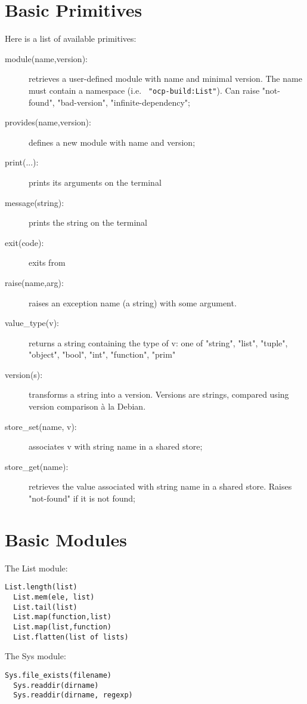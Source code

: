 \section{Basic Primitives}

Here is a list of available primitives:
\begin{description}
\item[module(name,version):] retrieves a user-defined module with name
  and minimal version. The name must contain a namespace (i.e. {\tt
    "ocp-build:List"}). Can raise {\sf "not-found", "bad-version",
    "infinite-dependency"};
\item[provides(name,version):] defines a new module with name and
  version;
\item[print(...):] prints its arguments on the terminal
\item[message(string):] prints the string on the terminal
\item[exit(code):] exits from \ocpbuild{}
\item[raise(name,arg):] raises an exception {\sf name} (a string) with
  some argument.
\item[value\_type(v):] returns a string containing the type of {\sf
  v}: one of {\sf "string", "list", "tuple", "object", "bool", "int",
  "function", "prim"}
\item[version(s):] transforms a string into a version. Versions are
  strings, compared using version comparison à la Debian.
\item[store\_set(name, v):] associates {\sf v} with string {\sf name}
  in a shared store;
\item[store\_get(name):] retrieves the value associated with string
  {\sf name} in a shared store. Raises {\sf "not-found"} if it is not
  found;
\end{description}

\section{Basic Modules}

The {\sf List} module:
\begin{lstlisting}[language=ocp2]
  List.length(list)
  List.mem(ele, list)
  List.tail(list)
  List.map(function,list)
  List.map(list,function)
  List.flatten(list of lists)
\end{lstlisting}

The {\sf Sys} module:
\begin{lstlisting}[language=ocp2]
  Sys.file_exists(filename)
  Sys.readdir(dirname)
  Sys.readdir(dirname, regexp)
\end{lstlisting}

